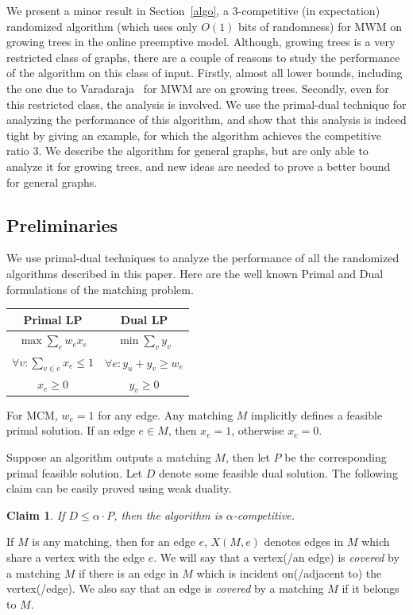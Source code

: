 \documentclass[11pt]{article}
\newtheorem{claim}[theorem]{Claim}
\begin{document}
We present a minor result in Section~\ref{algo}, a $3$-competitive (in expectation) randomized  algorithm (which uses only $O(1)$ bits of randomness) for MWM on growing trees in the online preemptive model.  Although, growing trees is a very restricted class of graphs, there are a couple of reasons to study the performance of the algorithm on this class of input. Firstly, almost all lower bounds, including the one due to Varadaraja~\cite{varadaraja} for MWM are on growing trees. Secondly, even for this restricted class, the analysis is involved. We use the primal-dual technique for analyzing the performance of this algorithm, and show that this analysis is indeed tight by giving an example, for which the algorithm achieves the competitive ratio $3$.  We describe the algorithm for general graphs, but are only able to analyze it for growing trees, and new ideas are needed to prove a better bound for general graphs. 
\subsection{Preliminaries}\label{prelim}
We use primal-dual techniques to analyze the performance of all the randomized algorithms described in this paper. Here are the well known Primal and Dual formulations of the matching problem.
 \begin{center}
 \begin{tabular}{c|c}
 Primal LP & Dual LP \\\hline
 $\max \sum_e w_ex_e$ & $\min \sum_v y_v$\\
 $\forall v:\sum_{v\in e}x_e \leq 1$ & $\forall e: y_u + y_v \geq w_e$\\
 $x_e\geq 0$ & $y_v \geq 0$
 \end{tabular}
\end{center}
For MCM, $w_e=1$ for any edge. Any matching $M$ implicitly defines a feasible primal solution. If an edge $e\in M$, then $x_e=1$, otherwise $x_e=0$.

Suppose an algorithm outputs a matching $M$, then let $P$ be the corresponding primal feasible solution. Let $D$ denote some feasible dual solution. The following claim can be easily proved using weak duality.
\begin{claim}\label{ar_lemma}
If $D \leq \alpha\cdot P$, then the algorithm is $\alpha$-competitive.
\end{claim}
If $M$ is any matching, then for an edge $e$, $X(M,e)$ denotes edges in $M$ which share a vertex with the edge $e$. We will say that a vertex(/an edge) is {\em covered } by a matching $M$ if there is an edge in $M$ which is incident on(/adjacent to) the vertex(/edge). We also say that an edge is {\em covered } by a matching $M$ if it belongs to $M$.
\end{document}
